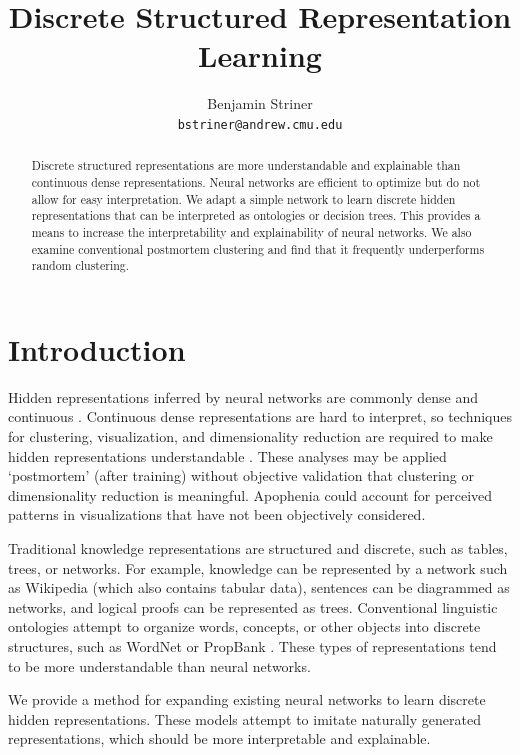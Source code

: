 \documentclass[11pt,letterpaper]{article}
\title{Discrete Structured Representation Learning}
\author{Benjamin Striner \\
  {\tt bstriner@andrew.cmu.edu} \\}
\date{}
\begin{document}
\maketitle
\begin{abstract}
Discrete structured representations are more understandable and explainable than continuous dense representations. Neural networks are efficient to optimize but do not allow for easy interpretation. We adapt a simple network to learn discrete hidden representations that can be interpreted as ontologies or decision trees. This provides a means to increase the interpretability and explainability of neural networks. We also examine conventional postmortem clustering and find that it frequently underperforms random clustering.
\end{abstract}

\section{Introduction}

Hidden representations inferred by neural networks are commonly dense and continuous \cite{pennington2014glove} \cite{Mikolov1301} \cite{MikolovSCCD13}. Continuous dense representations are hard to interpret, so techniques for clustering, visualization, and dimensionality reduction are required to make hidden representations understandable \cite{Montavon}. These analyses may be applied `postmortem' (after training) without objective validation that clustering or dimensionality reduction is meaningful. Apophenia could account for perceived patterns in visualizations that have not been objectively considered.


Traditional knowledge representations are structured and discrete, such as tables, trees, or networks. For example, knowledge can be represented by a network such as Wikipedia (which also contains tabular data), sentences can be diagrammed as networks, and logical proofs can be represented as trees. Conventional linguistic ontologies attempt to organize words, concepts, or other objects into discrete structures, such as WordNet \cite{Miller:1995:WLD:219717.219748} or PropBank \cite{Kingsbury02fromtreebank}. These types of representations tend to be more understandable than neural networks.

We provide a method for expanding existing neural networks to learn discrete hidden representations. These models attempt to imitate naturally generated representations, which should be more interpretable and explainable.
\end{document}
